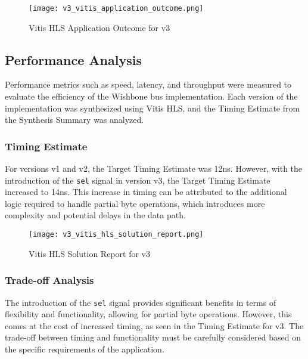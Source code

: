 \documentclass[12pt]{report}
\begin{document}
\begin{figure}[H]
    \centering
    \texttt{[image: v3\_vitis\_application\_outcome.png]}
    \caption{Vitis HLS Application Outcome for v3}
    \label{fig:v3_vitis_application_outcome}
\end{figure}

\subsection{Performance Analysis}
Performance metrics such as speed, latency, and throughput were measured to evaluate the efficiency of the Wishbone bus implementation. Each version of the implementation was synthesized using Vitis HLS, and the Timing Estimate from the Synthesis Summary was analyzed.

\subsubsection{Timing Estimate}
For versions v1 and v2, the Target Timing Estimate was 12ns. However, with the introduction of the \texttt{sel} signal in version v3, the Target Timing Estimate increased to 14ns. This increase in timing can be attributed to the additional logic required to handle partial byte operations, which introduces more complexity and potential delays in the data path.

\begin{figure}[H]
    \centering
    \texttt{[image: v3\_vitis\_hls\_solution\_report.png]}
    \caption{Vitis HLS Solution Report for v3}
    \label{fig:v3_vitis_hls_solution_report}
\end{figure}

\subsubsection{Trade-off Analysis}
The introduction of the \texttt{sel} signal provides significant benefits in terms of flexibility and functionality, allowing for partial byte operations. However, this comes at the cost of increased timing, as seen in the Timing Estimate for v3. The trade-off between timing and functionality must be carefully considered based on the specific requirements of the application.
\end{document}
